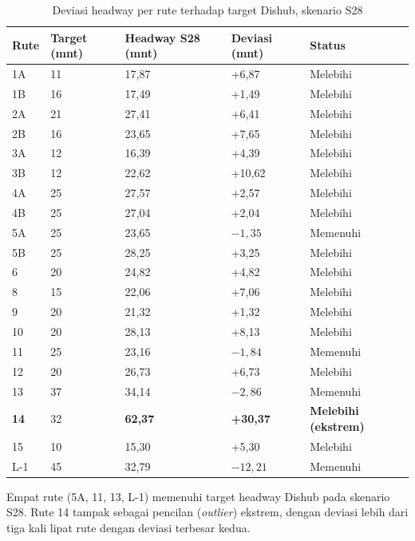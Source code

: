 \begin{table}[h]
	\centering
	\caption{Deviasi headway per rute terhadap target Dishub, skenario S28}
	\label{tab:eval-per-rute-s28}
	\begin{tabular}{|l|l|l|l|l|}
		\hline
		\textbf{Rute} & \textbf{Target (mnt)} & \textbf{Headway S28 (mnt)} & \textbf{Deviasi (mnt)} & \textbf{Status} \\
		\hline
		1A & 11 & 17,87 & +6,87 & Melebihi \\ \hline
		1B & 16 & 17,49 & +1,49 & Melebihi \\ \hline
		2A & 21 & 27,41 & +6,41 & Melebihi \\ \hline
		2B & 16 & 23,65 & +7,65 & Melebihi \\ \hline
		3A & 12 & 16,39 & +4,39 & Melebihi \\ \hline
		3B & 12 & 22,62 & +10,62 & Melebihi \\ \hline
		4A & 25 & 27,57 & +2,57 & Melebihi \\ \hline
		4B & 25 & 27,04 & +2,04 & Melebihi \\ \hline
		5A & 25 & 23,65 & $-1,35$ & Memenuhi \\ \hline
		5B & 25 & 28,25 & +3,25 & Melebihi \\ \hline
		6 & 20 & 24,82 & +4,82 & Melebihi \\ \hline
		8 & 15 & 22,06 & +7,06 & Melebihi \\ \hline
		9 & 20 & 21,32 & +1,32 & Melebihi \\ \hline
		10 & 20 & 28,13 & +8,13 & Melebihi \\ \hline
		11 & 25 & 23,16 & $-1,84$ & Memenuhi \\ \hline
		12 & 20 & 26,73 & +6,73 & Melebihi \\ \hline
		13 & 37 & 34,14 & $-2,86$ & Memenuhi \\ \hline
		\textbf{14} & 32 & \textbf{62,37} & \textbf{+30,37} & \textbf{Melebihi (ekstrem)} \\ \hline
		15 & 10 & 15,30 & +5,30 & Melebihi \\ \hline
		L-1 & 45 & 32,79 & $-12,21$ & Memenuhi \\ \hline
	\end{tabular}
\end{table}

Empat rute (5A, 11, 13, L-1) memenuhi target headway Dishub pada skenario
S28. Rute 14 tampak sebagai pencilan (\textit{outlier}) ekstrem, dengan
deviasi lebih dari tiga kali lipat rute dengan deviasi terbesar kedua.


